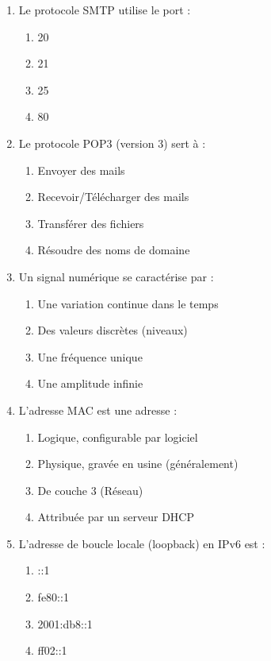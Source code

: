 \documentclass[11pt]{article}
\begin{document}
\begin{exercice}
\begin{enumerate}
    \item Le protocole SMTP utilise le port : 
    \begin{enumerate}
        \item 20 \item 21 \item 25 \item 80
    \end{enumerate}
    \item Le protocole POP3 (version 3) sert à :
    \begin{enumerate}
        \item Envoyer des mails \item Recevoir/Télécharger des mails \item Transférer des fichiers \item Résoudre des noms de domaine
    \end{enumerate}
    \item Un signal numérique se caractérise par :
    \begin{enumerate}
        \item Une variation continue dans le temps \item Des valeurs discrètes (niveaux) \item Une fréquence unique \item Une amplitude infinie
    \end{enumerate}
    \item L'adresse MAC est une adresse :
    \begin{enumerate}
        \item Logique, configurable par logiciel \item Physique, gravée en usine (généralement) \item De couche 3 (Réseau) \item Attribuée par un serveur DHCP
    \end{enumerate}
    \item L'adresse de boucle locale (loopback) en IPv6 est :
    \begin{enumerate}
        \item ::1 \item fe80::1 \item 2001:db8::1 \item ff02::1
    \end{enumerate}
\end{enumerate}
\end{exercice}
\end{document}
